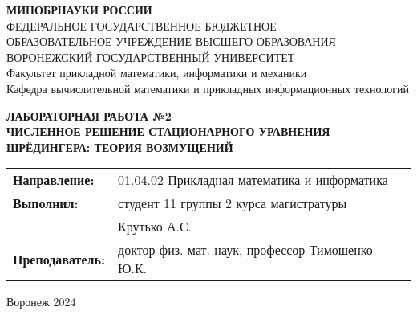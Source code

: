 \documentclass[a4paper,12pt]{article}
\begin{document}

\lstset{style=pythonStyle}

\pagestyle{empty}

\begin{center}
\textbf{МИНОБРНАУКИ РОССИИ}\\
ФЕДЕРАЛЬНОЕ ГОСУДАРСТВЕННОЕ БЮДЖЕТНОЕ \\
ОБРАЗОВАТЕЛЬНОЕ УЧРЕЖДЕНИЕ ВЫСШЕГО ОБРАЗОВАНИЯ \\
ВОРОНЕЖСКИЙ ГОСУДАРСТВЕННЫЙ УНИВЕРСИТЕТ \\
Факультет прикладной математики, информатики и механики\\
Кафедра вычислительной математики и прикладных информационных технологий
\end{center}

\vspace{2cm}
\begin{center}
\textbf{ЛАБОРАТОРНАЯ РАБОТА №2}\\
\textbf{ЧИСЛЕННОЕ РЕШЕНИЕ СТАЦИОНАРНОГО УРАВНЕНИЯ ШРЁДИНГЕРА: ТЕОРИЯ ВОЗМУЩЕНИЙ}
\end{center}

\vspace{3cm}
\begin{flushright}
\begin{tabular}{l l}
\textbf{Направление:} & 01.04.02 \textendash{} Прикладная математика и информатика \\
\textbf{Выполнил:} & студент 11 группы 2 курса магистратуры \\
& Крутько А.С. \\
\textbf{Преподаватель:} & доктор физ.-мат. наук, профессор Тимошенко Ю.К.
\end{tabular}
\end{flushright}

\vspace{3cm}
\begin{center}
Воронеж 2024
\end{center}
\end{document}
